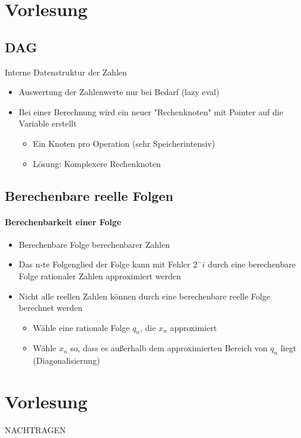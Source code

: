 \documentclass[ngerman]{scrartcl}
\begin{document}
\section{Vorlesung}

\subsection{DAG}
Interne Datenstruktur der Zahlen
\begin{itemize}
  \item Auswertung der Zahlenwerte nur bei Bedarf (lazy eval)
  \item Bei einer Berechnung wird ein neuer "Rechenknoten" mit Pointer auf die Variable erstellt
  \begin{itemize}
    \item Ein Knoten pro Operation (sehr Speicherintensiv)
    \item Lösung: Komplexere Rechenknoten
  \end{itemize}
\end{itemize}

\subsection{Berechenbare reelle Folgen}
\paragraph{Berechenbarkeit einer Folge}
\begin{itemize}
  \item Berechenbare Folge berechenbarer Zahlen
  \item Das n-te Folgenglied der Folge kann mit Fehler $ 2^-i $ durch eine berechenbare Folge rationaler Zahlen approximiert werden
  \item Nicht alle reellen Zahlen können durch eine berechenbare reelle Folge berechnet werden
  \begin{itemize}
    \item Wähle eine rationale Folge $ q_n $, die $ x_n $ approximiert
    \item Wähle $ x_n $ so, dass es außerhalb dem approximierten Bereich von $ q_n $ liegt (Diagonalisierung)
  \end{itemize}
\end{itemize}

\section{Vorlesung}
NACHTRAGEN
\end{document}
